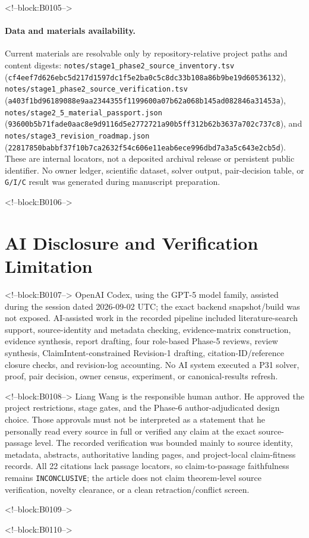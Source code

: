 \documentclass[11pt]{article}
\begin{document}
<!--block:B0105-->
\paragraph{Data and materials availability.} Current materials are
resolvable only by repository-relative project paths and content digests:
\texttt{notes/stage1\_phase2\_source\_inventory.tsv}
(\texttt{cf4eef7d626ebc5d217d1597dc1f5e2ba0c5c8dc33b108a86b9be19d60536132}),
\texttt{notes/stage1\_phase2\_source\_verification.tsv}
(\texttt{a403f1bd96189088e9aa2344355f1199600a07b62a068b145ad082846a31453a}),
\texttt{notes/stage2\_5\_material\_passport.json}
(\texttt{93600b5b71fade0aac8e9d9116d5e2772721a90b5ff312b62b3637a702c737c8}),
and \texttt{notes/stage3\_revision\_roadmap.json}
(\texttt{22817850babbf37f10b7ca2632f54c606e11eab6ece996dbd7a3a5c643e2cb5d}).
These are internal locators, not a deposited archival release or persistent
public identifier. No owner ledger, scientific dataset, solver output,
pair-decision table, or \texttt{G/I/C} result was generated during manuscript
preparation.

<!--block:B0106-->
\hypertarget{ai-disclosure-and-verification-limitation}{%
\section*{AI Disclosure and Verification
Limitation}\label{ai-disclosure-and-verification-limitation}}

<!--block:B0107-->
OpenAI Codex, using the GPT-5 model family, assisted during the session
dated 2026-09-02 UTC; the exact backend snapshot/build was not exposed.
AI-assisted work in the recorded pipeline included literature-search
support, source-identity and metadata checking, evidence-matrix
construction, evidence synthesis, report drafting, four role-based
Phase-5 reviews, review synthesis, ClaimIntent-constrained Revision-1
drafting, citation-ID/reference closure checks, and revision-log
accounting. No AI system executed a P31 solver, proof, pair decision,
owner census, experiment, or canonical-results refresh.

<!--block:B0108-->
Liang Wang is the responsible human author. He approved the project
restrictions, stage gates, and the Phase-6 author-adjudicated design
choice. Those approvals must not be interpreted as a statement that he
personally read every source in full or verified any claim at the exact
source-passage level. The recorded verification was bounded mainly to
source identity, metadata, abstracts, authoritative landing pages, and
project-local claim-fitness records. All 22 citations lack passage
locators, so claim-to-passage faithfulness remains
\texttt{INCONCLUSIVE}; the article does not claim theorem-level source
verification, novelty clearance, or a clean retraction/conflict screen.

<!--block:B0109-->



<!--block:B0110-->
\end{document}
